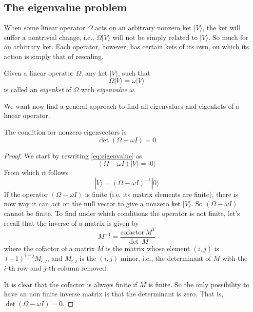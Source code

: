 \documentclass[11pt,fleqn]{book} %
\newcommand{\ket}[1]{| #1\rangle}
\begin{document}
\subsection{The eigenvalue problem}
When some linear operator $\Omega$ acts on an arbitrary nonzero ket $\ket{V}$, the ket will suffer a nontrivial 
change, i.e., $\Omega\ket{V}$ will not be simply related to $\ket{V}$.
So much for an arbitrary ket. Each operator, however, has certain kets of its own, on which its action is simply
that of rescaling.
\begin{definition}
    Given a linear operator $\Omega$, any ket $\ket{V}$, such that
    \begin{equation}
        \label{eq:eigenvalue}
        \Omega\ket{V}=\omega\ket{V}
    \end{equation}
is called an \textit{eigenket} of $\Omega$ with \textit{eigenvalue} $\omega$.
\end{definition}

We want now find a general approach to find all eigenvalues and eigenkets of a linear operator.

\begin{theorem}
    The condition for nonzero eigenvectors is
    \begin{equation}
        \det  \left(\Omega-\omega I\right) = 0
    \end{equation}
\end{theorem}
\begin{proof}
    We start by rewriting \ref{eq:eigenvalue} as 
\begin{equation*}
        \left(\Omega-\omega I\right)\ket{V}=\ket{0}
    \end{equation*}
    From which it follows
    \begin{equation*}
        \ket{V} = \left(\Omega-\omega I\right)^{-1}\ket{0}
    \end{equation*}
    If the operator $\left(\Omega-\omega I\right)$ is finite (i.e. its matrix elements are finite), there is now way it can
    act on the null vector to give a nonzero ket $\ket{V}$. So $\left(\Omega-\omega I\right)$ cannot be finite.
    To find under which conditions the operator is not finite, let's recall that the inverse of a matrix is given by
    \begin{equation*}
        M^{-1}=\frac{\mbox{cofactor}\,M^T}{\det\,M}
    \end{equation*}
    where the cofactor of a matrix $M$ is the matrix whose element $(i,j)$ is $(-1)^{i+j}M_{i,j}$, and $M_{i,j}$ is the $(i,j)$ minor,
    i.e., the determinant of $M$ with the $i$-th row and $j$-th column removed.

    It is clear that the cofactor is always finite if $M$ is finite. So the only possibility to have an non finite inverse matrix
    is that the determinant is zero. That is, $\det  \left(\Omega-\omega I\right) = 0$.
\end{proof}
\end{document}
